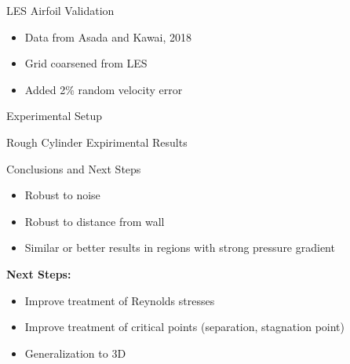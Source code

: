 \documentclass{beamer}
\begin{document}
\begin{frame}{LES Airfoil Validation}
    \begin{itemize}
        \item Data from Asada and Kawai, 2018
        \item Grid coarsened from LES
        \item Added 2\% random velocity error
    \end{itemize}
\end{frame}


\begin{frame}{Experimental Setup}
\end{frame}


\begin{frame}{Rough Cylinder Expirimental Results}
\end{frame}


\begin{frame}{Conclusions and Next Steps}
    \begin{itemize}
        \item Robust to noise
        \item Robust to distance from wall
        \item Similar or better results in regions with strong pressure gradient
    \end{itemize}
    \textbf{Next Steps:}
    \begin{itemize}
        \item Improve treatment of Reynolds stresses
        \item Improve treatment of critical points (separation, stagnation point)
        \item Generalization to 3D
    \end{itemize}
\end{frame}
\end{document}
